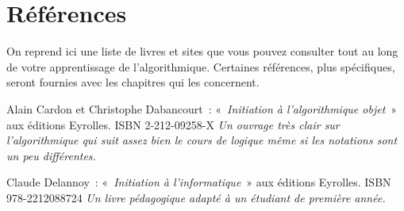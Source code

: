 \section{Références}
	
	On reprend ici une liste de livres et sites que vous pouvez consulter
	tout au long de votre apprentissage de
	l'algorithmique. Certaines références, plus
	spécifiques, seront fournies avec les chapitres qui les concernent.

	\begin{liste}
	\item 
		Alain Cardon et Christophe Dabancourt~: «~\textit{Initiation à
		l'algorithmique objet}~» aux éditions Eyrolles. ISBN
		2-212-09258-X
		\textit{Un ouvrage très clair sur l'algorithmique qui
		suit assez bien le cours de logique même si les notations sont un peu
		différentes.}
	\item
		Claude Delannoy~: «~\textit{Initiation à
		l'informatique}~» aux éditions Eyrolles. 
		ISBN 978-2212088724
		\textit{Un livre pédagogique adapté à un étudiant de première année.}
	\end{liste}
